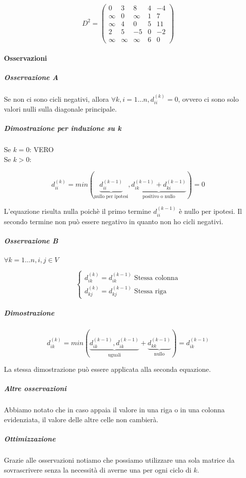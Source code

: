 \[
D^2 =
 \begin{pmatrix}
  0 & 3 & 8 & 4 & -4 \\
  \infty & 0 & \infty & 1 & 7 \\
  \infty & 4 & 0 & 5 & 11 \\
  2 & 5 & -5 & 0 & -2 \\
  \infty & \infty & \infty & 6 & 0
 \end{pmatrix}
\]

\paragraph{Osservazioni}

\subparagraph{Osservazione A}

Se non ci sono cicli negativi, allora $\forall k,i = 1\ldots n, d_{ii}^{(k)} = 0$, ovvero ci sono solo valori nulli sulla diagonale principale.

\subparagraph{Dimostrazione per induzione su k}

Se $k=0$: VERO \\
Se $k>0$:

\begin{equation}
d_{ii}^{(k)} = min( \underbrace{d_{ii}^{(k-1)}}_\text{nullo per ipotesi} ,  \underbrace{d_{ik}^{(k-1)} + d_{ki}^{(k-1)}}_\text{positivo o nullo} ) = 0
\end{equation}

L'equazione risulta nulla poichè il primo termine $d_{ii}^{(k-1)}$ è nullo per ipotesi.
Il secondo termine non può essere negativo in quanto non ho cicli negativi.

\subparagraph{Osservazione B}

$\forall k = 1\ldots n,i,j \in V$

\[
\begin{cases} d_{ik}^{(k)} = d_{ik}^{(k-1)} \mbox{ Stessa colonna} \\ d_{kj}^{(k)} = d_{kj}^{(k-1)} \mbox{ Stessa riga} \end{cases}
\]

\subparagraph{Dimostrazione}

\begin{equation}
d_{ik}^{(k)} = min(  \underbrace{ d_{ik}^{(k-1)} , d_{ik}^{(k-1)}  }_\text{uguali} + \underbrace{ d_{kk}^{(k-1)} }_\text{nullo} ) = d_{ik}^{(k-1)}
\end{equation}

La stessa dimostrazione può essere applicata alla seconda equazione.

\subparagraph{Altre osservazioni}
Abbiamo notato che in caso appaia il valore \infty in una riga o in una colonna evidenziata, il valore delle altre celle non cambierà.

\subparagraph{Ottimizzazione}

Grazie alle osservazioni notiamo che possiamo utilizzare una sola matrice da sovrascrivere senza la necessità di averne una per ogni ciclo di $k$.


